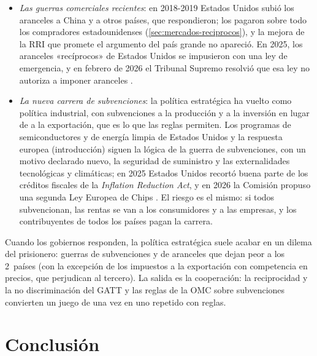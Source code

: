 \documentclass[11pt]{article}
\begin{document}
\begin{itemize}
\begin{itemize}
  \end{itemize}
\item \emph{Las guerras comerciales recientes}: en 2018-2019 Estados Unidos subió los aranceles a China y a otros países, que respondieron; los pagaron sobre todo los compradores estadounidenses (\ref{sec:mercados-reciprocos}), y la mejora de la RRI que promete el argumento del país grande no apareció. En 2025, los aranceles «recíprocos» de Estados Unidos se impusieron con una ley de emergencia, y en febrero de 2026 el Tribunal Supremo resolvió que esa ley no autoriza a imponer aranceles\nocite{JonesDay2026IEEPA} .
\item \emph{La nueva carrera de subvenciones}: la política estratégica ha vuelto como política industrial, con subvenciones a la producción y a la inversión en lugar de a la exportación, que es lo que las reglas permiten. Los programas de semiconductores y de energía limpia de Estados Unidos y la respuesta europea (introducción) siguen la lógica de la guerra de subvenciones, con un motivo declarado nuevo, la seguridad de suministro y las externalidades tecnológicas y climáticas; en 2025 Estados Unidos recortó buena parte de los créditos fiscales de la \emph{Inflation Reduction Act}\nocite{Congreso2025OBBBA}, y en 2026 la Comisión propuso una segunda Ley Europea de Chips\nocite{CE2026ChipsAct} . El riesgo es el mismo: si todos subvencionan, las rentas se van a los consumidores y a las empresas, y los contribuyentes de todos los países pagan la carrera.
\end{itemize}

\begin{ideaclave}
Cuando los gobiernos responden, la política estratégica suele acabar en un dilema del prisionero: guerras de subvenciones y de aranceles que dejan peor a los 2~países (con la excepción de los impuestos a la exportación con competencia en precios, que perjudican al tercero). La salida es la cooperación: la reciprocidad y la no discriminación del GATT y las reglas de la OMC sobre subvenciones convierten un juego de una vez en uno repetido con reglas.
\end{ideaclave}

\section*{Conclusión}
\end{document}
